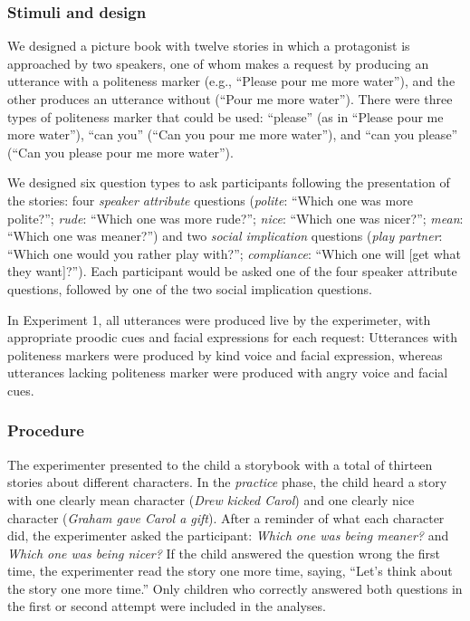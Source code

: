 \documentclass[10pt, letterpaper]{article}
\begin{document}
\subsubsection{Stimuli and design}\label{stimuli-and-design}

We designed a picture book with twelve stories in which a protagonist is
approached by two speakers, one of whom makes a request by producing an
utterance with a politeness marker (e.g., ``Please pour me more
water''), and the other produces an utterance without (``Pour me more
water''). There were three types of politeness marker that could be
used: ``please'' (as in ``Please pour me more water''), ``can you''
(``Can you pour me more water''), and ``can you please'' (``Can you
please pour me more water'').

We designed six question types to ask participants following the
presentation of the stories: four \emph{speaker attribute} questions
(\emph{polite}: ``Which one was more polite?''; \emph{rude}: ``Which one
was more rude?''; \emph{nice}: ``Which one was nicer?''; \emph{mean}:
``Which one was meaner?'') and two \emph{social implication} questions
(\emph{play partner}: ``Which one would you rather play with?'';
\emph{compliance}: ``Which one will {[}get what they want{]}?''). Each
participant would be asked one of the four speaker attribute questions,
followed by one of the two social implication questions.

In Experiment 1, all utterances were produced live by the experimeter,
with appropriate proodic cues and facial expressions for each request:
Utterances with politeness markers were produced by kind voice and
facial expression, whereas utterances lacking politeness marker were
produced with angry voice and facial cues.

\subsubsection{Procedure}\label{procedure}

The experimenter presented to the child a storybook with a total of
thirteen stories about different characters. In the \emph{practice}
phase, the child heard a story with one clearly mean character
(\emph{Drew kicked Carol}) and one clearly nice character (\emph{Graham
gave Carol a gift}). After a reminder of what each character did, the
experimenter asked the participant: \emph{Which one was being meaner?}
and \emph{Which one was being nicer?} If the child answered the question
wrong the first time, the experimenter read the story one more time,
saying, ``Let's think about the story one more time.'' Only children who
correctly answered both questions in the first or second attempt were
included in the analyses.
\end{document}
